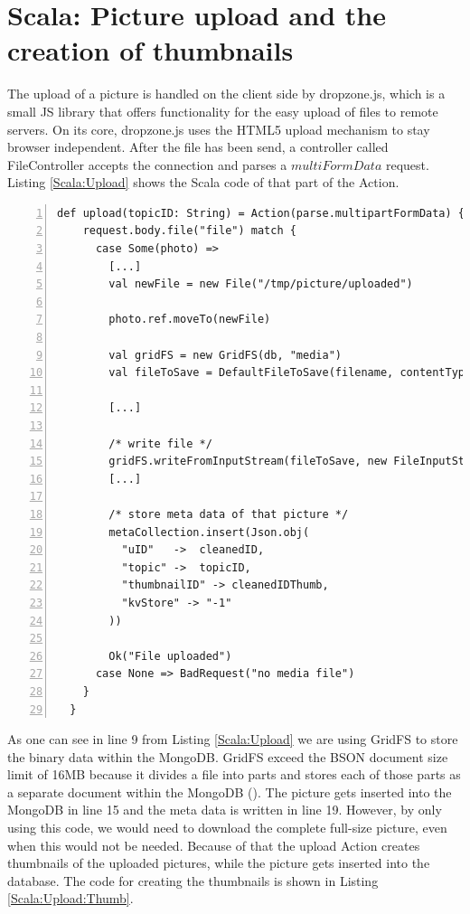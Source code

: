 \section{Scala: Picture upload and the creation of thumbnails}
The upload of a picture is handled on the client side by dropzone.js, which is a small \ac{JS} library that offers functionality for the easy upload of files to remote servers. On its core, dropzone.js uses the \ac{HTML5} upload mechanism to stay  browser independent. After the file has been send, a controller called FileController accepts the connection and parses a $multiFormData$ request. Listing \ref{Scala:Upload} shows the Scala code of that part of the Action.

\begin{lstlisting}[numbers=left,caption={Snippet of the upload Action of the FileController for uploading pictures},label=Scala:Upload,frame=tlbr,breaklines]
def upload(topicID: String) = Action(parse.multipartFormData) { request =>
    request.body.file("file") match {
      case Some(photo) =>
        [...]
        val newFile = new File("/tmp/picture/uploaded")

        photo.ref.moveTo(newFile)

        val gridFS = new GridFS(db, "media")
        val fileToSave = DefaultFileToSave(filename, contentType)

        [...]

        /* write file */
        gridFS.writeFromInputStream(fileToSave, new FileInputStream(newFile))
        [...]

        /* store meta data of that picture */
        metaCollection.insert(Json.obj(
          "uID"   ->  cleanedID,
          "topic" ->  topicID,
          "thumbnailID" -> cleanedIDThumb,
          "kvStore" -> "-1"
        ))

        Ok("File uploaded")
      case None => BadRequest("no media file")
    }
  }
\end{lstlisting}

As one can see in line 9 from Listing \ref{Scala:Upload} we are using GridFS to store the binary data within the MongoDB. GridFS exceed the \ac{BSON} document size limit of 16MB because it divides a file into parts and stores each of those parts as a separate document within the MongoDB (\cite{gridfs}). The picture gets inserted into the MongoDB in line 15 and the meta data is written in line 19. However, by only using this code, we would need to download the complete full-size picture, even when this would not be needed. Because of that the upload Action creates thumbnails of the uploaded pictures, while the picture gets inserted into the database. The code for creating the thumbnails is shown in Listing \ref{Scala:Upload:Thumb}.

